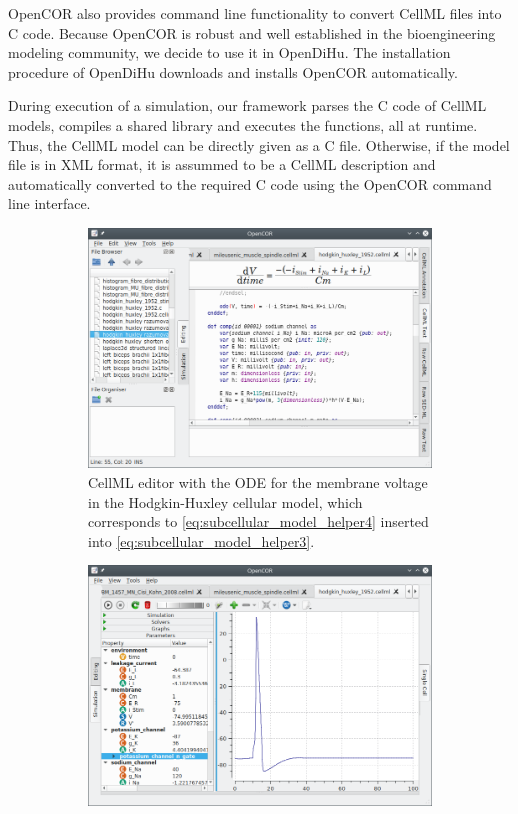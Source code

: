 OpenCOR also provides command line functionality to convert CellML files into C code. Because OpenCOR is robust and well established in the bioengineering modeling community, we decide to use it in OpenDiHu. The installation procedure of OpenDiHu downloads and installs OpenCOR automatically.

During execution of a simulation, our framework parses the C code of CellML models, compiles a shared library and executes the functions, all at runtime. Thus, the CellML model can be directly given as a C file. Otherwise, if the model file is in XML format, it is assummed to be a CellML description and automatically converted to the required C code using the OpenCOR command line interface.

\begin{figure}%
  \centering%
  \begin{subfigure}[t]{0.45\textwidth}%
    \centering%
    \includegraphics[width=\textwidth]{images/implementation/opencor1.png}
    \caption{CellML editor with the ODE for the membrane voltage  in the Hodgkin-Huxley cellular model, which corresponds to \cref{eq:subcellular_model_helper4} inserted into \cref{eq:subcellular_model_helper3}.}%
    \label{fig:opencor1}%
  \end{subfigure}
  \quad
  \begin{subfigure}[t]{0.45\textwidth}%
    \centering%
    \includegraphics[width=\textwidth]{images/implementation/opencor2.png}

\end{subfigure}
\end{figure}

